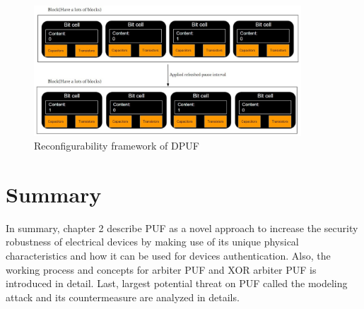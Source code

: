 \begin{figure}[htp]
    \centering
    \includegraphics[width=10cm]{figures/figure9.jpg}
    \caption{Reconfigurability framework of DPUF}
    \label{fig:figure9}
    \end{figure}

\section{Summary}
In summary, chapter 2 describe PUF as a novel approach to increase the security robustness of electrical devices by making use of its unique physical characteristics and how it can be used
for devices authentication. Also, the working process and concepts for arbiter PUF and XOR arbiter PUF is introduced in detail. Last, largest potential threat on PUF called the modeling attack 
and its countermeasure are analyzed in details.